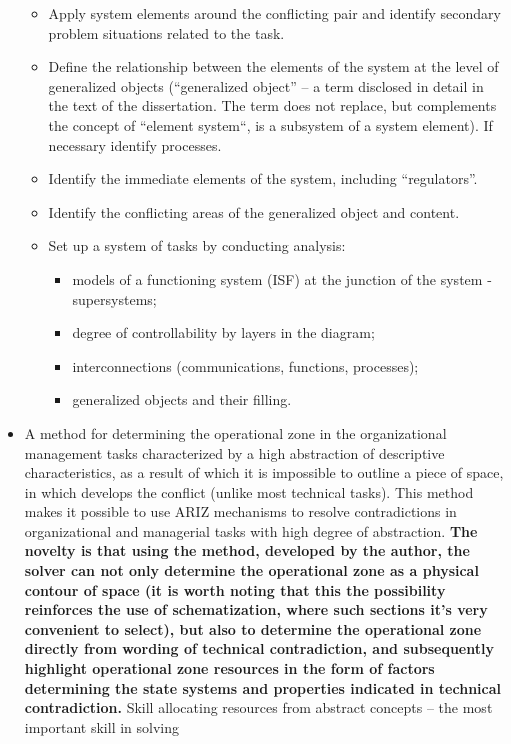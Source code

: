 \begin{itemize}
\begin{itemize}
\item Apply system elements around the conflicting pair and identify secondary
  problem situations related to the task.
\item Define the relationship between the elements of the system at the level
  of generalized objects (“generalized object” -- a term disclosed in detail
  in the text of the dissertation. The term does not replace, but complements
  the concept of “element system“, is a subsystem of a system element). If
  necessary identify processes.
\item Identify the immediate elements of the system, including “regulators”.
\item Identify the conflicting areas of the generalized object and content.
\item Set up a system of tasks by conducting analysis:
  \begin{itemize}
  \item models of a functioning system (ISF) at the junction of the system -
    supersystems;
  \item degree of controllability by layers in the diagram;
  \item interconnections (communications, functions, processes);
  \item generalized objects and their filling.
  \end{itemize}
\end{itemize}
\item A method for determining the operational zone in the organizational
  management tasks characterized by a high abstraction of descriptive
  characteristics, as a result of which it is impossible to outline a piece of
  space, in which develops the conflict (unlike most technical tasks).  This
  method makes it possible to use ARIZ mechanisms to resolve contradictions in
  organizational and managerial tasks with high degree of abstraction.
  \textbf{The novelty is that using the method, developed by the author, the
    solver can not only determine the operational zone as a physical contour
    of space (it is worth noting that this the possibility reinforces the use
    of schematization, where such sections it’s very convenient to select),
    but also to determine the operational zone directly from wording of
    technical contradiction, and subsequently highlight operational zone
    resources in the form of factors determining the state systems and
    properties indicated in technical contradiction.} Skill allocating
    resources from abstract concepts -- the most important skill in solving

\end{itemize}
